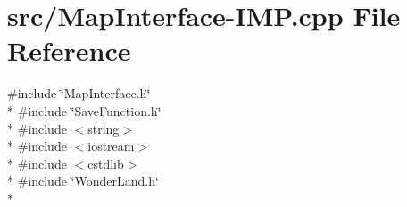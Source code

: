 \hypertarget{MapInterface-IMP_8cpp}{\section{src/\-Map\-Interface-\/\-I\-M\-P.cpp File Reference}
\label{MapInterface-IMP_8cpp}
}
{\ttfamily \#include \char`\"{}Map\-Interface.\-h\char`\"{}}\\*
{\ttfamily \#include \char`\"{}Save\-Function.\-h\char`\"{}}\\*
{\ttfamily \#include $<$string$>$}\\*
{\ttfamily \#include $<$iostream$>$}\\*
{\ttfamily \#include $<$cstdlib$>$}\\*
{\ttfamily \#include \char`\"{}Wonder\-Land.\-h\char`\"{}}\\*
